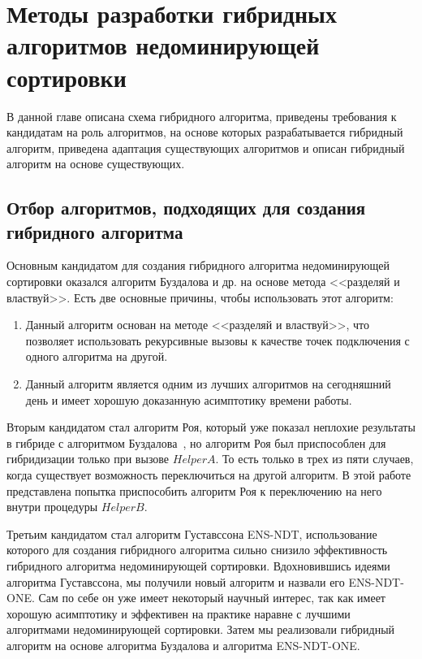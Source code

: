 \chapter{Методы разработки гибридных алгоритмов недоминирующей сортировки}
\label{chapter2}

В данной главе описана схема гибридного алгоритма, приведены требования к кандидатам на роль алгоритмов, на основе которых разрабатывается гибридный алгоритм, приведена адаптация существующих алгоритмов и описан гибридный алгоритм на основе существующих. 

\section{Отбор алгоритмов, подходящих для создания гибридного алгоритма}

Основным кандидатом для создания гибридного алгоритма недоминирующей сортировки оказался алгоритм Буздалова и др. на основе метода <<разделяй и властвуй>>. Есть две основные причины, чтобы использовать этот алгоритм:

\begin{enumerate}
 \item Данный алгоритм основан на методе <<разделяй и властвуй>>, что позволяет использовать рекурсивные вызовы к качестве точек подключения с одного алгоритма на другой.
 \item Данный алгоритм является одним из лучших алгоритмов на сегодняшний день и имеет хорошую доказанную асимптотику времени работы.
\end{enumerate}

Вторым кандидатом стал алгоритм Роя, который уже показал неплохие результаты в гибриде с алгоритмом Буздалова~\cite{Markina}, но алгоритм Роя был приспособлен для гибридизации только при вызове $HelperA$. То есть только в трех из пяти случаев, когда существует возможность переключиться на другой алгоритм. В этой работе представлена попытка приспособить алгоритм Роя к переключению на него внутри процедуры $HelperB$. 

Третьим кандидатом стал алгоритм Густавссона ENS-NDT, использование которого для создания гибридного алгоритма сильно снизило эффективность гибридного алгоритма недоминирующей сортировки. Вдохновившись идеями алгоритма Густавссона, мы получили новый алгоритм и назвали его ENS-NDT-ONE. Сам по себе он уже имеет некоторый научный интерес, так как имеет хорошую асимптотику и эффективен на практике наравне с лучшими алгоритмами недоминирующей сортировки. Затем мы реализовали гибридный алгоритм на основе алгоритма Буздалова и алгоритма ENS-NDT-ONE.


